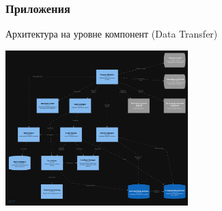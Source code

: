 \documentclass[pdf, hyperref={unicode}, aspectratio=169]{beamer}
\begin{document}
\begin{frame}
\frametitle{Приложения}
	Архитектура на уровне компонент (Data Transfer)

	\begin{center}
		\includegraphics[height = 6cm]{img/structurizr-DataTransferComponents}
	\end{center}
\end{frame}
\end{document}
